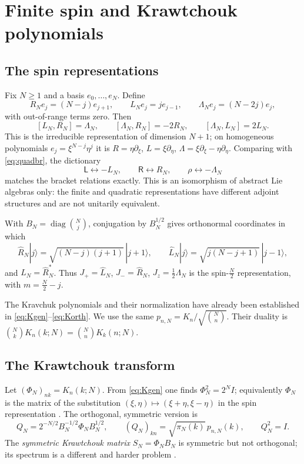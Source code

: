 \documentclass[11pt,reqno]{amsart}
\theoremstyle{definition}
\theoremstyle{remark}
\newcommand{\Id}{I}
\DeclareMathOperator{\diag}{diag}
\begin{document}
\section{Finite spin and Krawtchouk polynomials}\label{L:spin}

\subsection{The spin representations}
Fix $N\ge1$ and a basis $e_0,\dots,e_N$. Define
\[
R_Ne_j=(N-j)e_{j+1},\qquad L_Ne_j=je_{j-1},\qquad
\Lambda_Ne_j=(N-2j)e_j,
\]
with out-of-range terms zero. Then
\begin{equation}\label{eq:finbr}
[L_N,R_N]=\Lambda_N,\qquad [\Lambda_N,R_N]=-2R_N,\qquad
[\Lambda_N,L_N]=2L_N.
\end{equation}
This is the irreducible representation of dimension $N+1$; on
homogeneous polynomials $e_j=\xi^{N-j}\eta^j$ it is
$R=\eta\partial_\xi$, $L=\xi\partial_\eta$,
$\Lambda=\xi\partial_\xi-\eta\partial_\eta$. Comparing with
\eqref{eq:quadbr}, the dictionary
\begin{equation}\label{eq:dict}
\mathsf L\leftrightarrow-L_N,\qquad\mathsf R\leftrightarrow R_N,\qquad
\rho\leftrightarrow-\Lambda_N
\end{equation}
matches the bracket relations exactly. This is an isomorphism of
abstract Lie algebras only: the finite and quadratic representations
have different adjoint structures and are not unitarily equivalent.

With $B_N=\diag\binom Nj$, conjugation by $B_N^{1/2}$ gives orthonormal
coordinates in which
\[
\widehat R_N|j\rangle=\sqrt{(N-j)(j+1)}\,|j+1\rangle,\qquad
\widehat L_N|j\rangle=\sqrt{j(N-j+1)}\,|j-1\rangle,
\]
and $\widehat L_N=\widehat R_N^*$. Thus $J_+=\widehat L_N$,
$J_-=\widehat R_N$, $J_z=\frac12\Lambda_N$ is the spin-$\frac N2$
representation, with $m=\frac N2-j$.

The Kravchuk polynomials and their normalization have already been
established in \eqref{eq:Kgen}--\eqref{eq:Korth}. We use the same
$p_{n,N}=K_n/\sqrt{\binom Nn}$. Their duality is
$\binom NkK_n(k;N)=\binom NnK_k(n;N)$.

\subsection{The Krawtchouk transform}
Let $(\Phi_N)_{nk}=K_n(k;N)$. From \eqref{eq:Kgen} one finds
$\Phi_N^2=2^N\Id$; equivalently $\Phi_N$ is the matrix of the
substitution $(\xi,\eta)\mapsto(\xi+\eta,\xi-\eta)$ in the spin
representation \cite{FeinsilverKocik2005}. The orthogonal, symmetric
version is
\begin{equation}\label{eq:Q}
Q_N=2^{-N/2}B_N^{-1/2}\Phi_NB_N^{1/2},\qquad
(Q_N)_{kn}=\sqrt{\pi_N(k)}\,p_{n,N}(k),\qquad Q_N^2=\Id.
\end{equation}
The \emph{symmetric Krawtchouk matrix} $S_N=\Phi_NB_N$ is symmetric but
not orthogonal; its spectrum is a different and harder problem
\cite{FeinsilverFitzgerald1996}.
\end{document}
